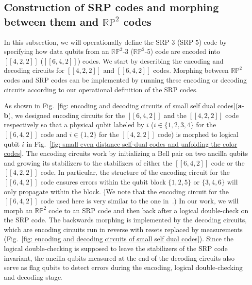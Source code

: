\documentclass[reprint,aps,twocolumn,superscriptaddress,showpacs,notitlepage,10pt]{revtex4-2}
\theoremstyle{definition}
\begin{document}
 



\subsection{Construction of SRP codes and morphing between them and \texorpdfstring{$\mathbb{RP}^2$}{RP} codes}\label{subsec: SRP code construction}

In this subsection, we will operationally define the SRP-3 (SRP-5) code by specifying how data qubits from an $\mathbb{RP}^2$-3 ($\mathbb{RP}^2$-5) code are encoded into $[[4,2,2]]$ ($[[6,4,2]]$) codes. We start by describing the encoding and decoding circuits for $[[4,2,2]]$ and $[[6,4,2]]$ codes. Morphing between $\mathbb{RP}^2$ codes and SRP codes can be implemented by running these encoding or decoding circuits according to our operational definition of the SRP codes. 


As shown in Fig.~\ref{fig: encoding and decoding circuits of small self dual codes}(\textbf{a}-\textbf{b}), we designed encoding circuits for the $[[6,4,2]]$ and the $[[4,2,2]]$ code respectively so that a physical qubit labeled by $i$ ($i\in\{1,2,3,4\}$ for the $[[6,4,2]]$ code and $i\in\{1,2\}$ for the $[[4,2,2]]$ code) is morphed to logical qubit $i$ in Fig.~\ref{fig: small even distance self-dual codes and unfolding the color codes}.  The encoding circuits work by initializing a Bell pair on two ancilla qubits and growing its stabilizers to the stabilizers of either the $[[6,4,2]]$ code or the $[[4,2,2]]$ code. In particular, the structure of the encoding circuit for the $[[6,4,2]]$ code ensures errors within the qubit block $\{1,2,5\}$ or $\{3,4,6\}$ will only propagate within the block. (We note that the encoding circuit for the $[[6,4,2]]$ code used here is very similar to the one in~\cite{goto_2024}.) In our work, we will morph an $\mathbb{RP}^2$ code to an SRP code and then back after a logical double-check on the SRP code. The backwards morphing is implemented by the decoding circuits, which are encoding circuits run in reverse with resets replaced by measurements (Fig.~\ref{fig: encoding and decoding circuits of small self dual codes}). Since the logical double-checking is supposed to leave the stabilizers of the SRP code invariant,  the ancilla qubits measured at the end of the decoding circuits also serve as flag qubits to detect errors during the encoding, logical double-checking and decoding stage.     

 
\end{document}
